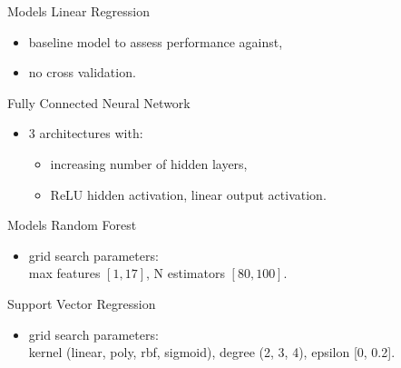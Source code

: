 \documentclass[xcolor=table]{beamer} %
\begin{document}
\begin{frame}{Models}
  \vspace{-0.5cm}
  Linear Regression
  \begin{itemize}
      \item baseline model to assess performance against,
      \item no cross validation.
  \end{itemize}
  Fully Connected Neural Network
  \begin{itemize}
      \item 3 architectures with:
        \begin{itemize}
            \item increasing number of hidden layers,
            \item ReLU hidden activation, linear output activation.
        \end{itemize}
  \end{itemize}
\end{frame}

\begin{frame}{Models}
  \vspace{-0.5cm}
  Random Forest
  \begin{itemize}
      \item grid search parameters:\\
      max features $[1, 17]$, N estimators $[80, 100]$.
  \end{itemize}
  Support Vector Regression
  \begin{itemize}
      \item grid search parameters:\\
      kernel (linear, poly, rbf, sigmoid), degree (2, 3, 4), epsilon [0, 0.2].
  \end{itemize}
\end{frame}
\end{document}
